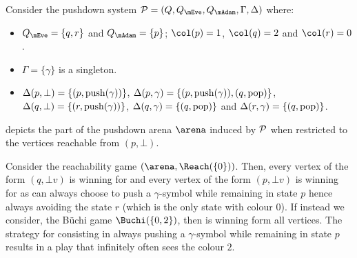 \begin{example}\label{11-ex:pushdown-game-1}
Consider the pushdown system $\PDS = (Q,Q_{\mEve}, Q_{\mAdam}, \Gamma,\Delta)$ where:
\begin{itemize}
	\item $Q_{\mEve}=\{q,r\}$ and $Q_{\mAdam}=\{p\}$; $\pdscol{p} = 1$, $\pdscol{q} = 2$ and $\pdscol{r} = 0$.
	\item $\Gamma=\{\gamma\}$ is a singleton.
	\item $\Delta(p,\bot) = \{(p,\mathrm{push}(\gamma))\}$, $\Delta(p,\gamma) = \{(p,\mathrm{push}(\gamma)),(q,\mathrm{pop})\}$, $\Delta(q,\bot) = \{(r,\mathrm{push}(\gamma))\}$, $\Delta(q,\gamma) = \{(q,\mathrm{pop})\}$ and $\Delta(r,\gamma) = \{(q,\mathrm{pop})\}$.
\end{itemize}

 depicts the part of the pushdown arena $\arena$ induced by $\mathcal{P}$ when restricted to the vertices reachable from $(p,\bot)$.

Consider the reachability game $(\arena, \Reach(\{0\}))$. Then, every vertex of the form $(q,\bot v)$ is winning for \Eve and every vertex of the form $(p,\bot v)$ is winning for \Adam as \Adam can always choose to push a $\gamma$-symbol while remaining in state $p$ hence always avoiding the state $r$ (which is the only state with colour $0$). If instead we consider, the B{\"u}chi game $\Buchi(\{0,2\})$, then \Eve is winning form all vertices. The strategy for \Adam consisting in always pushing a $\gamma$-symbol while remaining in state $p$ results in a play that infinitely often sees the colour $2$.

\begin{figure}[htb]
\begin{center}
\end{center}
\end{figure}
\end{example}
